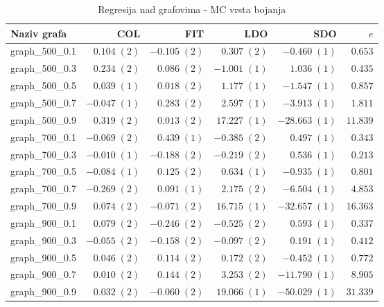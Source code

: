 \documentclass[times, utf8, diplomski, numeric]{fer}
\begin{document}
\begin{table}[!H]
	\caption{Regresija nad grafovima - MC vrsta bojanja}
	\label{tbl:regresija-MC}
	\centering
	\begin{tabular}{|l|r|r|r|r|r|} \hline
	Naziv grafa & COL & FIT & LDO & SDO & $e$ \\ \hline \hline
graph\_500\_0.1 & $ 0.104\; (2) $ & $ -0.105\; (2) $ & $ 0.307\; (2) $ & $ -0.460\; (1) $ & $ 0.653 $\\ \hline
graph\_500\_0.3 & $ 0.234\; (2) $ & $ 0.086\; (2) $ & $ -1.001\; (1) $ & $ 1.036\; (1) $ & $ 0.435 $\\ \hline
graph\_500\_0.5 & $ 0.039\; (1) $ & $ 0.018\; (2) $ & $ 1.177\; (1) $ & $ -1.547\; (1) $ & $ 0.857 $\\ \hline
graph\_500\_0.7 & $ -0.047\; (1) $ & $ 0.283\; (2) $ & $ 2.597\; (1) $ & $ -3.913\; (1) $ & $ 1.811 $\\ \hline
graph\_500\_0.9 & $ 0.319\; (2) $ & $ 0.013\; (2) $ & $ 17.227\; (1) $ & $ -28.663\; (1) $ & $ 11.839 $\\ \hline
graph\_700\_0.1 & $ -0.069\; (2) $ & $ 0.439\; (1) $ & $ -0.385\; (2) $ & $ 0.497\; (1) $ & $ 0.343 $\\ \hline
graph\_700\_0.3 & $ -0.010\; (1) $ & $ -0.188\; (2) $ & $ -0.219\; (2) $ & $ 0.536\; (1) $ & $ 0.213 $\\ \hline
graph\_700\_0.5 & $ -0.084\; (1) $ & $ 0.125\; (2) $ & $ 0.634\; (1) $ & $ -0.935\; (1) $ & $ 0.801 $\\ \hline
graph\_700\_0.7 & $ -0.269\; (2) $ & $ 0.091\; (1) $ & $ 2.175\; (2) $ & $ -6.504\; (1) $ & $ 4.853 $\\ \hline
graph\_700\_0.9 & $ 0.074\; (2) $ & $ -0.071\; (2) $ & $ 16.715\; (1) $ & $ -32.657\; (1) $ & $ 16.363 $\\ \hline
graph\_900\_0.1 & $ 0.079\; (2) $ & $ -0.246\; (2) $ & $ -0.525\; (2) $ & $ 0.593\; (1) $ & $ 0.337 $\\ \hline
graph\_900\_0.3 & $ -0.055\; (2) $ & $ -0.158\; (2) $ & $ -0.097\; (2) $ & $ 0.191\; (1) $ & $ 0.412 $\\ \hline
graph\_900\_0.5 & $ 0.046\; (2) $ & $ 0.114\; (2) $ & $ 0.172\; (2) $ & $ -0.452\; (1) $ & $ 0.772 $\\ \hline
graph\_900\_0.7 & $ 0.010\; (2) $ & $ 0.144\; (2) $ & $ 3.253\; (2) $ & $ -11.790\; (1) $ & $ 8.905 $\\ \hline
graph\_900\_0.9 & $ 0.032\; (2) $ & $ -0.060\; (2) $ & $ 19.066\; (1) $ & $ -50.029\; (1) $ & $ 31.339 $\\ \hline
	\end{tabular}
\end{table} 
\end{document}
